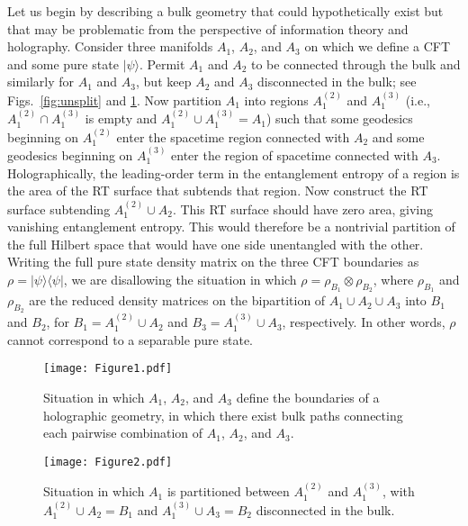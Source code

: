 \documentclass[12pt,english]{article}
\begin{document}
Let us begin by describing a bulk geometry that could hypothetically exist but that may be problematic from the perspective of information theory and holography. Consider three manifolds $A_1$, $A_2$, and $A_3$ on which we define a CFT and some pure state $|\psi\rangle$. Permit $A_1$ and $A_2$ to be connected through the bulk and similarly for $A_1$ and $A_3$, but keep $A_2$ and $A_3$ disconnected in the bulk; see Figs.~\ref{fig:unsplit} and \ref{fig:split}. Now partition $A_1$ into regions $A_1^{(2)}$ and $A_1^{(3)}$ (i.e., $A_1^{(2)} \cap A_1^{(3)}$ is empty and $A_1^{(2)} \cup A_1^{(3)} = A_1$) such that some geodesics beginning on $A_1^{(2)}$ enter the spacetime region connected with $A_2$ and some geodesics beginning on $A_1^{(3)}$ enter the region of spacetime connected with $A_3$. Holographically, the leading-order term in the entanglement entropy of a region is the area of the RT surface that subtends that region. Now construct the RT surface subtending $A_1^{(2)} \cup A_2$. This RT surface should have zero area, giving vanishing entanglement entropy. This would therefore be a nontrivial partition of the full Hilbert space that would have one side unentangled with the other. Writing the full pure state density matrix on the three CFT boundaries as $\rho=|\psi\rangle\langle\psi|$, we are disallowing the situation in which $\rho = \rho_{B_1}\otimes \rho_{B_2}$, where $\rho_{B_1}$ and $\rho_{B_2}$ are the reduced density matrices on the bipartition of $A_1 \cup A_2 \cup A_3$ into $B_1$ and $B_2$, for $B_1 = A_1^{(2)} \cup A_2$ and $B_3 = A_1^{(3)} \cup A_3$, respectively. In other words, $\rho$ cannot correspond to a separable pure state.

\begin{figure}[!tbp]
  \centering
  \begin{minipage}[b]{0.43\textwidth}
    \texttt{[image: Figure1.pdf]}
    \caption{Situation in which $A_1$, $A_2$, and $A_3$ define the boundaries of a holographic geometry, in which there exist bulk paths connecting each pairwise combination of $A_1$, $A_2$, and $A_3$.\label{fig:unsplit}}
  \end{minipage}
  \hfill
  \begin{minipage}[b]{0.43\textwidth}
    \texttt{[image: Figure2.pdf]}
    \caption{Situation in which $A_1$ is partitioned between $A_1^{(2)}$ and $A_1^{(3)}$, with $A_1^{(2)} \cup A_2 = B_1$ and $A_1^{(3)} \cup A_3 = B_2$ disconnected in the bulk.\newline \label{fig:split}}
  \end{minipage}
\end{figure}
\end{document}
